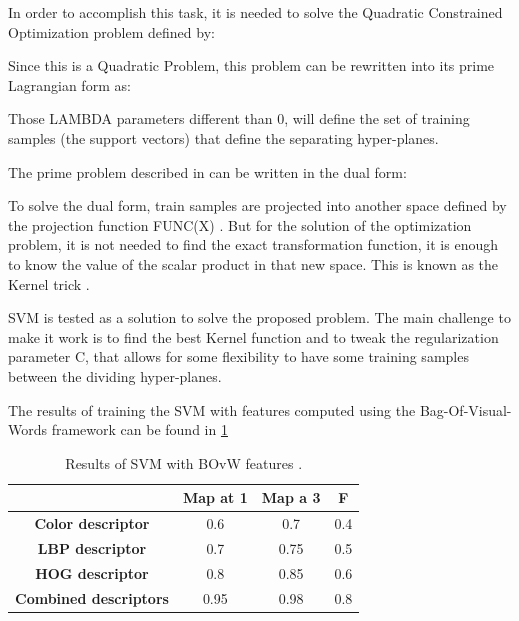 \documentclass[runningheads]{llncs}
\begin{document}
In order to accomplish this task, it is needed to solve the Quadratic Constrained Optimization problem defined by: 

Since this is a Quadratic Problem, this problem can be rewritten into its prime Lagrangian form as:

Those LAMBDA parameters  different than 0, will define the set of training samples (the support vectors) that define the separating hyper-planes.

The prime problem described in  can be written in the dual form:

To solve the dual form, train samples are projected into another space defined by the projection function FUNC(X) . But for the solution of the optimization problem, it is not needed to find the exact transformation function, it is enough to know the value of the scalar product in that new space. This is known as the Kernel trick \cite{10.1109/5254.708428}. 

SVM is tested as a solution to solve the proposed problem. The main challenge to make it work is to find the best Kernel function and to tweak the regularization parameter C, that allows for some flexibility to have some training samples between the dividing hyper-planes.

The results of training the SVM with features computed using the Bag-Of-Visual-Words framework can be found in \ref{SVMResults}

\begin{table}[ht!]
\caption{Results of SVM with BOvW features .}
\begin{center}
\begin{tabular}{ | c | c | c | c | }
\hline
 & \textbf{Map at 1} & \textbf{Map a 3} & \textbf{F} \\ 
 \hline
 \textbf{Color descriptor} & 0.6 & 0.7 & 0.4 \\  
 \hline
 \textbf{LBP descriptor} & 0.7 & 0.75 & 0.5 \\ 
 \hline
 \textbf{HOG descriptor} & 0.8 & 0.85 & 0.6 \\  
 \hline
 \textbf{Combined descriptors} & 0.95 & 0.98 & 0.8 \\  
 \hline
\end{tabular}
\label{SVMResults}
\end{center}
\end{table}
\end{document}
